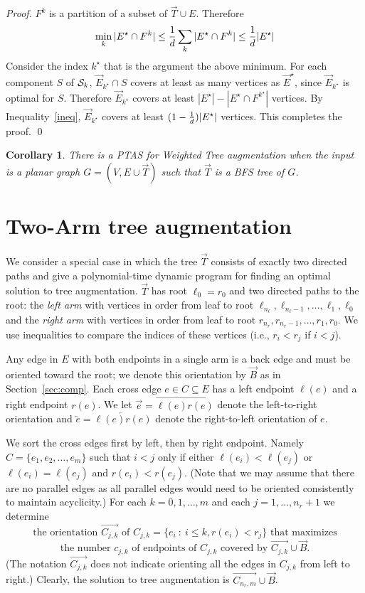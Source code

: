 \documentclass{article}
\newtheorem{cor}[theorem]{Corollary}
\newcommand{\ora}{\overrightarrow}
\newcommand{\ola}{\overleftarrow}
\begin{document}
\begin{proof}
$F^k$ is a partition of a subset of $\ora T \cup E$.  Therefore
\begin{equation}\label{ineq}
\min_k |E^\star \cap F^k| \leq {1\over d} \sum_k |E^\star \cap F^k|
\leq {1\over d} |E^\star|
\end{equation}
Consider the index $k^\star$ that is the argument the above minimum.
For each component $S$ of ${\cal S}_k$, $\ora E_{k^\star} \cap S$
covers at least as many vertices as $\ora E^\star$, since $\ora
E_{k^\star}$ is optimal for $S$.  Therefore $\ora E_{k^\star}$ covers
at least $|E^\star|-|E^\star \cap F^{k^\star}|$ vertices.  By
Inequality~\ref{ineq}, $\ora E_{k^\star}$ covers at least $(1-{1\over
  d})|E^\star|$ vertices.
This completes the proof.
\qed \end{proof}
\begin{cor}
There is a PTAS for {\sc Weighted Tree augmentation} when the input is
a planar graph $G = (V, E \cup \ora{T})$ such that $\ora T$ is a BFS
tree of $G$.
\end{cor}

\section{Two-Arm {\sc tree augmentation}}
\label{sec:twoarm}
We consider a special case in which the tree $\ora T$ consists of
exactly two directed paths and give a polynomial-time dynamic program
for finding an optimal solution to {\sc tree augmentation}.  $\ora T$
has root $\ell_0 = r_0$ and two directed paths to the root: the {\em
  left arm} with vertices in order from leaf to root $\ell_{n_\ell},
\ell_{n_\ell - 1}, \ldots, \ell_{1}, \ell_0$ and the {\em right arm}
with vertices in order from leaf to root $r_{n_r}, r_{n_r - 1},
\ldots, r_{1}, r_0$.  We use inequalities to compare the indices of
these vertices (i.e., $r_i < r_j$ if $i < j$).

Any edge in $E$ with both endpoints in a single
arm is a back edge and must be oriented toward the root; we denote
this orientation by $\ora B$ as in Section~\ref{sec:comp}.  Each cross
edge $e \in C \subseteq E$ has a left endpoint $\ell(e)$ and a right
endpoint $r(e)$.  We let $\ora e = \ora{\ell(e)r(e)}$ denote the
left-to-right orientation and $\ola e = \ola{\ell(e)r(e)}$ denote the
right-to-left orientation of $e$.

We sort the cross edges first by left, then by right endpoint.  Namely
$C = \{e_1, e_2, \ldots, e_m\}$ such that $i < j$ only if either
$\ell(e_i) < \ell(e_j)$ or $\ell(e_i)= \ell(e_j)$ and $r(e_i) <
r(e_j)$.  (Note that we may assume that there are no parallel edges as
all parallel edges would need to be oriented consistently to maintain
acyclicity.)  For each $k = 0,1,
\ldots, m$ and each $j = 1,\ldots,n_r+1$ we determine
\[
  \mbox{the orientation }\ora{C_{j,k}}\mbox{ of }C_{j,k} =
  \{e_i \ : \ i\le k, r(e_i) < r_j \} \mbox{ that maximizes}
\]\vspace{-5mm}
\[\mbox{the number } c_{j,k} \mbox{ of
    endpoints of }C_{j,k}\mbox{ covered by }\ora{C_{j,k}}\cup\ora B.
\]
(The notation $\ora{C_{j,k}}$ does not indicate orienting all the edges in
$C_{j,k}$ from left to right.)  
Clearly, the solution to {\sc tree augmentation} is $\ora{C_{n_r,m}}
\cup \ora B$.
\end{document}
